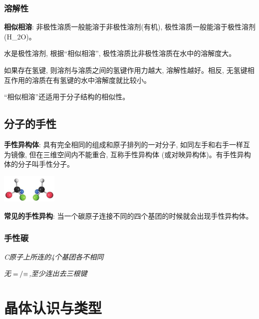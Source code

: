 \documentclass[10pt,cn]{elegantbook}
\begin{document}
\subsection{溶解性}



\textbf{相似相溶}: 非极性溶质一般能溶于非极性溶剂(有机), 极性溶质一般能溶于极性溶剂(H_{2}O)。

水是极性溶剂, 根据“相似相溶”, 极性溶质比非极性溶质在水中的溶解度大。

如果存在氢键, 则溶剂与溶质之间的氢键作用力越大, 溶解性越好。相反, 无氢键相互作用的溶质在有氢键的水中溶解度就比较小。

“相似相溶”还适用于分子结构的相似性。


\section{分子的手性}

\textbf{手性异构体}: 具有完全相同的组成和原子排列的一对分子, 如同左手和右手一样互为镜像, 但在三维空间内不能重合, 互称手性异构体 (或对映异构体)。有手性异构体的分子叫手性分子。

\begin{center}
	\includegraphics[max width=0.2\textwidth]{image/c102.jpg}
\end{center}

\textbf{常见的手性异构}: 当一个碳原子连接不同的四个基团的时候就会出现手性异构体。

\subsection{手性碳}

\textit{C原子上所连的4个基团各不相同}

\textit{无$\ce{=} /  \ce{#}$,至少连出去三根键}


\chapter{晶体认识与类型}

\end{document}
